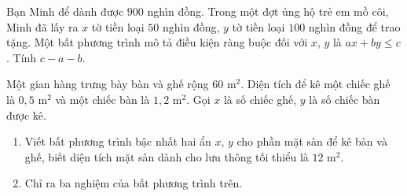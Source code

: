 
\begin{bt}%
	Bạn Minh để dành được $900$ nghìn đồng. Trong một đợt ủng hộ trẻ em mồ côi, Minh đã lấy ra $x$ tờ tiền loại $50$ nghìn đồng, $y$ tờ tiền  loại $100$ nghìn đồng để trao tặng. Một bất phương trình mô tả điều kiện ràng buộc đối với $x$, $y$ là $ax+by\le c$. Tính $c-a-b$.
\end{bt}

\begin{bt}%
	Một gian hàng trưng bày bàn và ghế rộng $60$ m$^2$. Diện tích để kê một chiếc ghế là $0{,}5$ m$^2$ và một chiếc bàn là $1{,}2$ m$^2$. Gọi $x$  là số chiếc ghế, $y$ là số chiếc bàn được kê.
	\begin{enumerate}
		\item Viết bất phương trình bậc nhất hai ẩn $x$, $y$ cho phần mặt sàn để kê bàn và ghế, biết diện tích mặt sàn dành cho lưu thông tối  thiểu là $12$ m$^2$.
		\item Chỉ ra ba nghiệm của  bất phương trình trên.
	\end{enumerate}
\end{bt}

